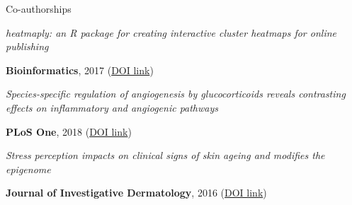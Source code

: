 \begin{cventries}
\cventry
{Co-authorships} %
{} %
{} %
{} %
{ %
    \begin{cvitems}
        \item {
            \begin{flushleft}
                \textit{
                    heatmaply: an R package for creating interactive cluster 
                    heatmaps for online publishing
                }
            \end{flushleft}
            \textbf{Bioinformatics}, 2017
            (\href{https://doi.org/10.1093/bioinformatics/btx657}{DOI link})
        }
        \item {
            \begin{flushleft}
                \textit{
                    Species-specific regulation of angiogenesis by 
                    glucocorticoids reveals contrasting effects on inflammatory 
                    and angiogenic pathways
                    } 
            \end{flushleft}
            \textbf{PLoS One}, 2018  
            (\href{https://doi.org/10.1371/journal.pone.0192746}{DOI link})
        }
        \item {
            \begin{flushleft}
                \textit{
                    Stress perception impacts on clinical signs of skin ageing 
                    and modifies the epigenome
                }
            \end{flushleft}
            \textbf{Journal of Investigative Dermatology}, 2016
            (\href{http://dx.doi.org/10.1016/j.jid.2016.06.079}{DOI link})
        }
    \end{cvitems}
}


\end{cventries}
